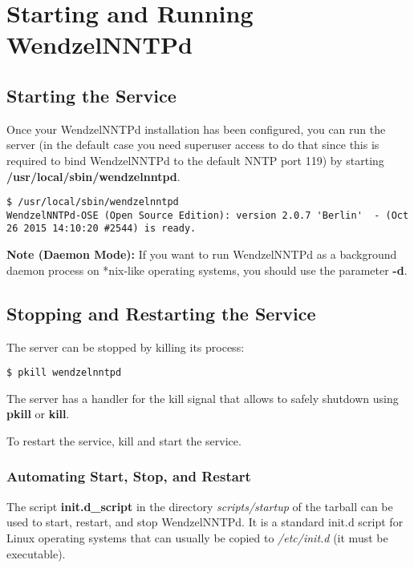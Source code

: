 \chapter{Starting and Running WendzelNNTPd}

\section{Starting the Service}

Once your WendzelNNTPd installation has been configured, you can run the server (in the default case you need superuser access to do that since this is required to bind WendzelNNTPd to the default NNTP port 119) by starting {\bf /usr/local/sbin/wendzelnntpd}.

\begin{verbatim}
$ /usr/local/sbin/wendzelnntpd 
WendzelNNTPd-OSE (Open Source Edition): version 2.0.7 'Berlin'  - (Oct
26 2015 14:10:20 #2544) is ready.
\end{verbatim}

{\bf Note (Daemon Mode):} If you want to run WendzelNNTPd as a background daemon process on *nix-like operating systems, you should use the parameter {\bf -d}.

\section{Stopping and Restarting the Service}

The server can be stopped by killing its process:

\begin{verbatim}
$ pkill wendzelnntpd
\end{verbatim}

The server has a handler for the kill signal that allows to safely shutdown using {\bf pkill} or {\bf kill}.

To restart the service, kill and start the service.

\subsection{Automating Start, Stop, and Restart}

The script {\bf init.d\_script} in the directory {\it scripts/startup} of the tarball can be used to start, restart, and stop WendzelNNTPd. It is a standard init.d script for Linux operating systems that can usually be copied to {\it /etc/init.d} (it must be executable).


